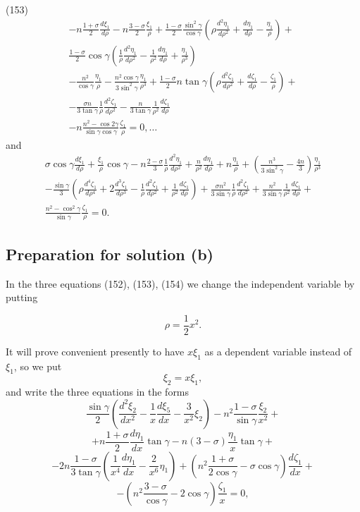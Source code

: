 (153)
\[\begin{array}{r}
-n \frac{1+\sigma}{2} \frac{d \xi_1}{d \rho}-n \frac{3-\sigma}{2} \frac{\xi_1}{\rho}+
\frac{1-\sigma}{2} \frac{\sin ^2 \gamma}{\cos \gamma}\left(\rho \frac{d^2 \eta_1}{d \rho^2}+\frac{d \eta_1}{d \rho}-\frac{\eta_1}{\rho}\right)+ \\
\frac{1-\sigma}{2} \cos \gamma\left(\frac{1}{\rho} \frac{d^2 \eta_1}{d \rho^2}-\frac{1}{\rho^2} \frac{d \eta_1}{d \rho}+\frac{\eta_1}{\rho^3}\right) \\
-\frac{n^2}{\cos \gamma} \frac{\eta_1}{\rho}-\frac{n^2 \cos \gamma}{3 \sin ^2 \gamma} \frac{\eta_1}{\rho^3}+\frac{1-\sigma}{2} n \tan \gamma\left(\rho \frac{d^2 \zeta_1}{d \rho^2}+\frac{d \zeta_1}{d \rho}-\frac{\zeta_1}{\rho}\right)+ \\
-\frac{\sigma n}{3 \tan \gamma} \frac{1}{\rho} \frac{d^2 \zeta_1}{d \rho^2}-\frac{n}{3 \tan \gamma} \frac{1}{\rho^2} \frac{d \zeta_1}{d \rho} \\
-n \frac{n^2-\cos 2 \gamma}{\sin \gamma \cos \gamma} \frac{\zeta_1}{\rho}=0, \ldots
\end{array}
\]
and
\[\begin{aligned}
\sigma \cos \gamma \frac{d \xi_1}{d \rho}+\frac{\xi_1}{\rho} \cos \gamma-n \frac{2-\sigma}{3} \frac{1}{\rho} \frac{d^2 \eta_1}{d \rho^2}+\frac{n}{\rho^2} \frac{d \eta_1}{d \rho}+n \frac{\eta_1}{\rho}+\left(\frac{n^3}{3 \sin ^2 \gamma}-\frac{4 n}{3}\right) \frac{\eta_1}{\rho^3} \\
-\frac{\sin \gamma}{3}\left(\rho \frac{d^4 \zeta_1}{d \rho^4}+2 \frac{d^3 \zeta_1}{d \rho^3}-\frac{1}{\rho} \frac{d^2 \zeta_1}{d \rho^2}+\frac{1}{\rho^2} \frac{d \zeta_1}{d \rho}\right)+\frac{\sigma n^2}{3 \sin \gamma} \frac{1}{\rho} \frac{d^2 \zeta_1}{d \rho^2}+\frac{n^2}{3 \sin \gamma} \frac{1}{\rho^2} \frac{d \zeta_1}{d \rho}+ \\
\frac{n^2-\cos ^2 \gamma}{\sin \gamma} \frac{\zeta_1}{\rho}=0 .
\end{aligned}\]

\subsection{Preparation for solution (b)}

In the three equations (152), (153), (154) we change the independent
variable by putting

\[\rho=\frac{1}{2} x^2 .\]

It will prove convenient presently to have \(x \xi_1\) as a dependent
variable instead of \(\xi_1\), so we put
\[\xi_2=x \xi_1,\]
and write the three equations in the forms
\[
\frac{\sin \gamma}{2}\left(\frac{d^2 \xi_2}{d x^2}-\frac{1}{x} \frac{d \xi_5}{d x}-\frac{3}{x^2} \xi_2\right)-n^2 \frac{1-\sigma}{\sin \gamma} \frac{\xi_2}{x^2}+
\]
\[
+n \frac{1+\sigma}{2} \frac{d \eta_1}{d x} \tan \gamma-n(3-\sigma) \frac{\eta_1}{x} \tan \gamma +
\]
\[
 -2 n \frac{1-\sigma}{3 \tan \gamma}\left(\frac{1}{x^4} \frac{d \eta_1}{d x}-\frac{2}{x^6} \eta_1\right)+\left(n^2 \frac{1+\sigma}{2 \cos \gamma}-\sigma \cos \gamma\right) \frac{d \zeta_1}{d x}+
\]
\[
-\left(n^2 \frac{3-\sigma}{\cos \gamma}-2 \cos \gamma\right) \frac{\zeta_1}{x}=0,
\]

